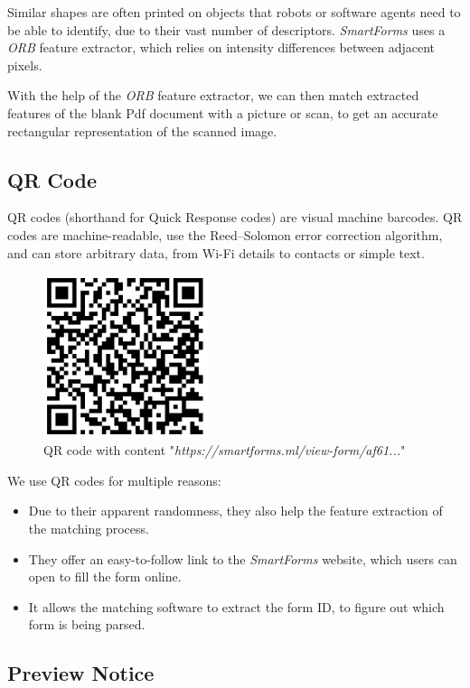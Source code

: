 \documentclass[12pt, a4paper]{report}
\begin{document}
Similar shapes are often printed on objects that robots or software agents need to be able to identify, due to their vast number of descriptors. \textit{SmartForms} uses a \textit{ORB} feature extractor\cite{rublee2011orb}, which relies on intensity differences between adjacent pixels.

With the help of the \textit{ORB} feature extractor, we can then match extracted features of the blank Pdf document with a picture or scan, to get an accurate rectangular representation of the scanned image.

\subsection{QR Code}

QR codes (shorthand for Quick Response codes) are visual machine barcodes. QR codes are machine-readable, use the Reed–Solomon error correction algorithm\cite{wicker1999reed}, and can store arbitrary data, from Wi-Fi details to contacts or simple text.

\begin{figure}[!h]
    \centering
    \includegraphics[width=13em]{images/screenshoots/sample-qr-code.png}
    \caption{QR code with content "\textit{https://smartforms.ml/view-form/af61...}"}
    \label{fig:label}
\end{figure}

We use QR codes for multiple reasons:
\begin{itemize}
    \item Due to their apparent randomness, they also help the feature extraction of the matching process.
    \item They offer an easy-to-follow link to the \textit{SmartForms} website, which users can open to fill the form online.
    \item It allows the matching software to extract the form ID, to figure out which form is being parsed.
\end{itemize}

\subsection{Preview Notice}
\end{document}
